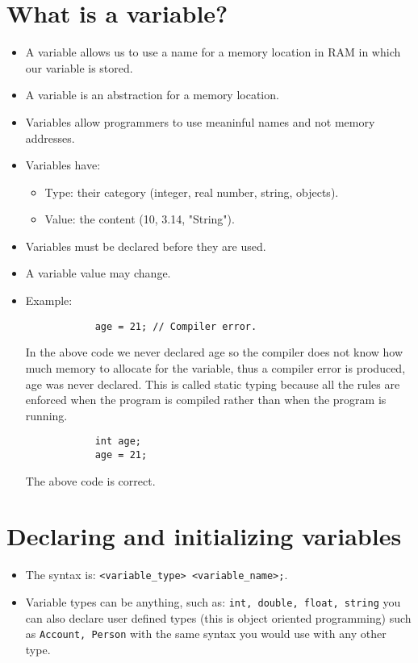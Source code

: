 \section{What is a variable?}
\begin{itemize}
    \item A variable allows us to use a name for a memory location in RAM in which our variable is stored.
    \item A variable is an abstraction for a memory location. 
    \item Variables allow programmers to use meaninful names and not memory addresses. 
    \item Variables have: 
        \begin{itemize}
            \item Type: their category (integer, real number, string, objects).
            \item Value: the content (10, 3.14, "String").
        \end{itemize}
    
    \item Variables must be declared before they are used. 
    \item A variable value may change.
    \item Example: 
        \begin{verbatim}
            age = 21; // Compiler error.
        \end{verbatim}
        In the above code we never declared age so the compiler does not know how much memory to allocate for the variable, thus a compiler error is produced, age was never declared. This is called static typing because all the rules are enforced when the program is compiled rather than when the program is running.
        \begin{verbatim}
            int age; 
            age = 21;
        \end{verbatim}
        The above code is correct.
\end{itemize}


\section{Declaring and initializing variables}
\begin{itemize}
    \item The syntax is: \verb|<variable_type> <variable_name>;|.
    \item Variable types can be anything, such as: \texttt{int, double, float, string} you can also declare user defined types (this is object oriented programming) such as \texttt{Account, Person} with the same syntax you would use with any other type.
\end{itemize}

